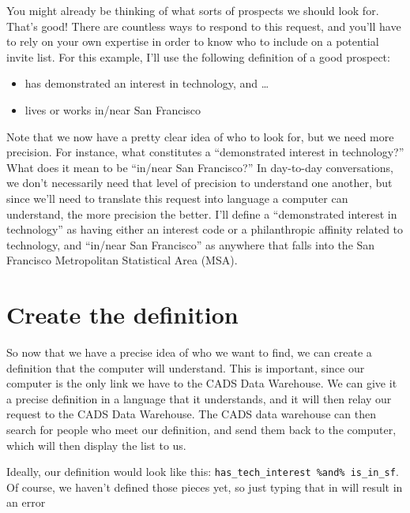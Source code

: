 \documentclass[]{book}
\newenvironment{Shaded}{\begin{snugshade}}{\end{snugshade}}
\newcommand{\NormalTok}[1]{#1}
\newcommand{\OperatorTok}[1]{\textcolor[rgb]{0.81,0.36,0.00}{\textbf{#1}}}
\newcommand{\StringTok}[1]{\textcolor[rgb]{0.31,0.60,0.02}{#1}}
\providecommand{\tightlist}{%
  \setlength{\itemsep}{0pt}\setlength{\parskip}{0pt}}
\begin{document}
You might already be thinking of what sorts of prospects we should look for. That's good! There are countless ways to respond to this request, and you'll have to rely on your own expertise in order to know who to include on a potential invite list. For this example, I'll use the following definition of a good prospect:

\begin{itemize}
\tightlist
\item
  has demonstrated an interest in technology, and \ldots{}
\item
  lives or works in/near San Francisco
\end{itemize}

Note that we now have a pretty clear idea of who to look for, but we need more precision. For instance, what constitutes a ``demonstrated interest in technology?'' What does it mean to be ``in/near San Francisco?'' In day-to-day conversations, we don't necessarily need that level of precision to understand one another, but since we'll need to translate this request into language a computer can understand, the more precision the better. I'll define a ``demonstrated interest in technology'' as having either an interest code or a philanthropic affinity related to technology, and ``in/near San Francisco'' as anywhere that falls into the San Francisco Metropolitan Statistical Area (MSA).

\hypertarget{intro-example-create-def}{%
\section{Create the definition}\label{intro-example-create-def}}

So now that we have a precise idea of who we want to find, we can create a definition that the computer will understand. This is important, since our computer is the only link we have to the CADS Data Warehouse. We can give it a precise definition in a language that it understands, and it will then relay our request to the CADS Data Warehouse. The CADS data warehouse can then search for people who meet our definition, and send them back to the computer, which will then display the list to us.

Ideally, our definition would look like this: \texttt{has\_tech\_interest\ \%and\%\ is\_in\_sf}. Of course, we haven't defined those pieces yet, so just typing that in will result in an error

\begin{Shaded}
\end{Shaded}
\end{document}

